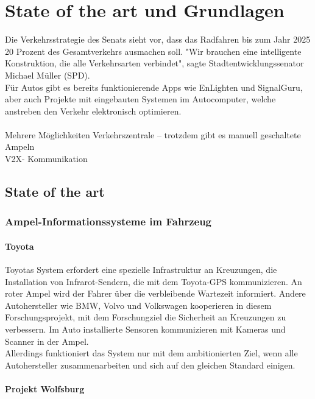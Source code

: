 \chapter{State of the art und Grundlagen}
Die Verkehrsstrategie des Senats sieht vor, dass das Radfahren bis zum Jahr 2025 20 Prozent des Gesamtverkehrs ausmachen soll. \cite{Mopo}
"Wir brauchen eine intelligente Konstruktion, die alle Verkehrsarten verbindet", sagte Stadtentwicklungssenator Michael Müller (SPD).\\
Für Autos gibt es bereits funktionierende \gls{App}s wie EnLighten und SignalGuru, aber auch Projekte mit eingebauten Systemen im Autocomputer, welche anstreben den Verkehr elektronisch optimieren.\\\\
Mehrere Möglichkeiten
Verkehrszentrale -- trotzdem gibt es manuell geschaltete Ampeln\\
\gls{V2X}- Kommunikation
\section{State of the art}
\subsection{Ampel-Informationssysteme im Fahrzeug}
\subsubsection{Toyota}
Toyotas System erfordert eine spezielle Infrastruktur an Kreuzungen, die Installation von Infrarot-Sendern, die mit dem Toyota-GPS kommunizieren. An roter Ampel wird der Fahrer über die verbleibende Wartezeit informiert. Andere Autohersteller wie BMW, Volvo und Volkswagen kooperieren in diesem Forschungsprojekt, mit dem Forschungziel die Sicherheit an Kreuzungen zu verbessern. Im Auto installierte Sensoren kommunizieren mit Kameras und Scanner in der Ampel. \\
Allerdings funktioniert das System nur mit dem ambitionierten Ziel, wenn alle Autohersteller zusammenarbeiten und sich auf den gleichen Standard einigen.
\subsubsection{Projekt Wolfsburg}
